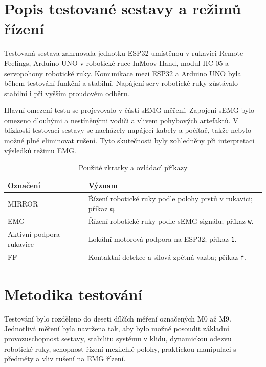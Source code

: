 \section{Popis testované sestavy a režimů řízení}
\label{sec:popis-testovane-sestavy}

Testovaná sestava zahrnovala jednotku ESP32 umístěnou v rukavici Remote Feelings, Arduino UNO v robotické ruce InMoov Hand, modul HC-05 a servopohony robotické ruky. Komunikace mezi ESP32 a Arduino UNO byla během testování funkční a stabilní. Napájení serv robotické ruky zůstávalo stabilní i při vyšším proudovém odběru.

Hlavní omezení testu se projevovalo v části sEMG měření. Zapojení sEMG bylo omezeno dlouhými a nestíněnými vodiči a vlivem pohybových artefaktů. V blízkosti testovací sestavy se nacházely napájecí kabely a počítač, takže nebylo možné plně eliminovat rušení. Tyto skutečnosti byly zohledněny při interpretaci výsledků režimu EMG\@.

\begin{table}[H]
\centering
\caption{Použité zkratky a ovládací příkazy}
\label{tab:pouzite-zkratky-prikazy}
\begin{tabular}{|p{}|p{}|}
\hline
\textbf{Označení} & \textbf{Význam} \\
\hline
MIRROR & Řízení robotické ruky podle polohy prstů v rukavici; příkaz \texttt{q}. \\
\hline
EMG & Řízení robotické ruky podle sEMG signálu; příkaz \texttt{w}. \\
\hline
Aktivní podpora rukavice & Lokální motorová podpora na ESP32; příkaz \texttt{1}. \\
\hline
FF & Kontaktní detekce a silová zpětná vazba; příkaz \texttt{f}. \\
\hline
\end{tabular}
\end{table}

\section{Metodika testování}
\label{sec:metodika-testovani}

Testování bylo rozděleno do deseti dílčích měření označených M0 až M9. Jednotlivá měření byla navržena tak, aby bylo možné posoudit základní provozuschopnost sestavy, stabilitu systému v klidu, dynamickou odezvu robotické ruky, schopnost řízení mezilehlé polohy, praktickou manipulaci s předměty a vliv rušení na EMG řízení.

